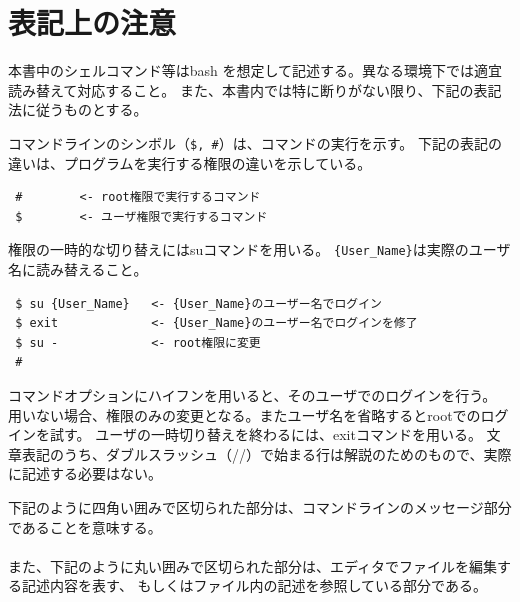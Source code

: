 \section{表記上の注意}

本書中のシェルコマンド等はbash を想定して記述する。異なる環境下では適宜読み替えて対応すること。
また、本書内では特に断りがない限り、下記の表記法に従うものとする。


コマンドラインのシンボル（\verb|$, #|）は、コマンドの実行を示す。
下記の表記の違いは、プログラムを実行する権限の違いを示している。

\begin{verbatim}
 #        <- root権限で実行するコマンド
 $        <- ユーザ権限で実行するコマンド
\end{verbatim}
権限の一時的な切り替えにはsuコマンドを用いる。
\verb|{User_Name}|は実際のユーザ名に読み替えること。
\begin{verbatim}
 $ su {User_Name}   <- {User_Name}のユーザー名でログイン
 $ exit             <- {User_Name}のユーザー名でログインを修了
 $ su -             <- root権限に変更
 #
\end{verbatim}

コマンドオプションにハイフンを用いると、そのユーザでのログインを行う。
用いない場合、権限のみの変更となる。またユーザ名を省略するとrootでのログインを試す。
ユーザの一時切り替えを終わるには、exitコマンドを用いる。
文章表記のうち、ダブルスラッシュ（//）で始まる行は解説のためのもので、実際に記述する必要はない。

下記のように四角い囲みで区切られた部分は、コマンドラインのメッセージ部分であることを意味する。\\

\\

また、下記のように丸い囲みで区切られた部分は、エディタでファイルを編集する記述内容を表す、
もしくはファイル内の記述を参照している部分である。\\

